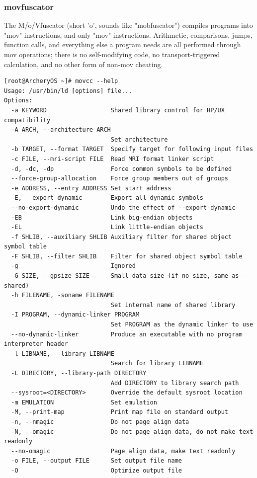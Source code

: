 \documentclass{article}
\begin{document}
\subsubsection{movfuscator}
The M/o/Vfuscator (short 'o', sounds like "mobfuscator") compiles programs into "mov" instructions, and only "mov" instructions. Arithmetic, comparisons, jumps, function calls, and everything else a program needs are all performed through mov operations; there is no self-modifying code, no transport-triggered calculation, and no other form of non-mov cheating.
\begin{lstlisting}
[root@ArcheryOS ~]# movcc --help
Usage: /usr/bin/ld [options] file...
Options:
  -a KEYWORD                  Shared library control for HP/UX compatibility
  -A ARCH, --architecture ARCH
                              Set architecture
  -b TARGET, --format TARGET  Specify target for following input files
  -c FILE, --mri-script FILE  Read MRI format linker script
  -d, -dc, -dp                Force common symbols to be defined
  --force-group-allocation    Force group members out of groups
  -e ADDRESS, --entry ADDRESS Set start address
  -E, --export-dynamic        Export all dynamic symbols
  --no-export-dynamic         Undo the effect of --export-dynamic
  -EB                         Link big-endian objects
  -EL                         Link little-endian objects
  -f SHLIB, --auxiliary SHLIB Auxiliary filter for shared object symbol table
  -F SHLIB, --filter SHLIB    Filter for shared object symbol table
  -g                          Ignored
  -G SIZE, --gpsize SIZE      Small data size (if no size, same as --shared)
  -h FILENAME, -soname FILENAME
                              Set internal name of shared library
  -I PROGRAM, --dynamic-linker PROGRAM
                              Set PROGRAM as the dynamic linker to use
  --no-dynamic-linker         Produce an executable with no program interpreter header
  -l LIBNAME, --library LIBNAME
                              Search for library LIBNAME
  -L DIRECTORY, --library-path DIRECTORY
                              Add DIRECTORY to library search path
  --sysroot=<DIRECTORY>       Override the default sysroot location
  -m EMULATION                Set emulation
  -M, --print-map             Print map file on standard output
  -n, --nmagic                Do not page align data
  -N, --omagic                Do not page align data, do not make text readonly
  --no-omagic                 Page align data, make text readonly
  -o FILE, --output FILE      Set output file name
  -O                          Optimize output file

\end{lstlisting}
\end{document}
